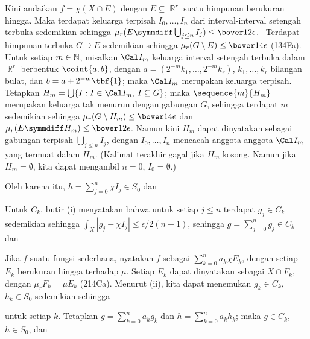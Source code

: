 { Kini andaikan $f=\chi(X\cap E)$ dengan
$E\subseteq\BbbR^r$ suatu himpunan berukuran hingga. Maka terdapat keluarga
terpisah $I_0,\ldots,I_n$ dari interval-interval setengah terbuka sedemikian
sehingga $\mu_r(E\symmdiff\bigcup_{j\le n}I_j)\le\bover12\epsilon$.
\Prf\ Terdapat himpunan terbuka $G\supseteq E$ sedemikian sehingga
$\mu_r(G\setminus E)\le\bover14\epsilon$ (134Fa). Untuk setiap
$m\in\Bbb N$, misalkan $\Cal I_m$ keluarga interval setengah terbuka dalam
$\BbbR^r$ berbentuk $\coint{a,b}$, dengan
$a=(2^{-m}k_1,\ldots,2^{-m}k_r)$, $k_1,\ldots,k_r$ bilangan bulat, dan
$b=a+2^{-m}\tbf{1}$; maka $\Cal I_m$ merupakan keluarga terpisah.
Tetapkan $H_m=\bigcup\{I:I\in\Cal I_m,\,I\subseteq G\}$; maka
$\sequence{m}{H_m}$ merupakan keluarga tak menurun dengan gabungan $G$,
sehingga terdapat $m$ sedemikian sehingga
$\mu_r(G\setminus H_m)\le\bover14\epsilon$ dan
$\mu_r(E\symmdiff H_m)\le\bover12\epsilon$. Namun kini $H_m$ dapat
dinyatakan sebagai gabungan terpisah $\bigcup_{j\le n}I_j$, dengan
$I_0,\ldots,I_n$ mencacah anggota-anggota $\Cal I_m$ yang termuat dalam
$H_m$. (Kalimat terakhir gagal jika $H_m$ kosong. Namun jika
$H_m=\emptyset$, kita dapat mengambil $n=0$, $I_0=\emptyset$.)\ \Qed

Oleh karena itu, $h=\sum_{j=0}^n\chi I_j\in S_0$ dan


\noindent Untuk $C_k$, butir (i) menyatakan bahwa untuk setiap $j\le n$
terdapat $g_j\in C_k$ sedemikian sehingga
$\int_X|g_j-\chi I_j|\le\epsilon/2(n+1)$, sehingga
$g=\sum_{j=0}^ng_j\in C_k$ dan


\medskip

 Jika $f$ suatu fungsi sederhana, nyatakan $f$ sebagai
$\sum_{k=0}^na_k\chi E_k$, dengan setiap $E_k$ berukuran hingga terhadap
$\mu$. Setiap $E_k$ dapat dinyatakan sebagai $X\cap F_k$, dengan
$\mu_rF_k=\mu E_k$ (214Ca). Menurut (ii), kita dapat menemukan
$g_k\in C_k$, $h_k\in S_0$ sedemikian sehingga


\noindent untuk setiap $k$. Tetapkan $g=\sum_{k=0}^na_kg_k$ dan
$h=\sum_{k=0}^na_kh_k$; maka $g\in C_k$, $h\in S_0$, dan

}
